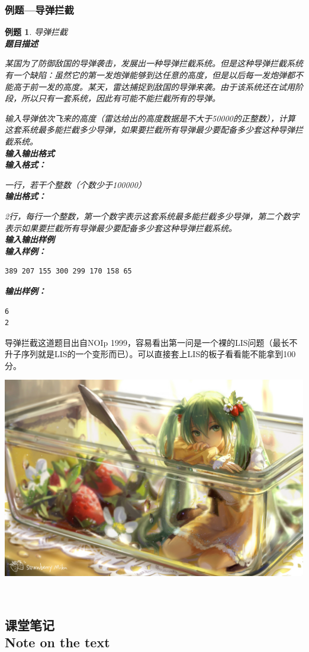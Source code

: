 \documentclass{article}
\newtheorem{example}{例题}[subsection]
\theoremstyle{nonumberplain}
\newcommand{\note}{\ \par


	\subsection*{课堂笔记\\\tiny{Note on the text}}
	\newpage}
\begin{document}
\subsubsection{例题---导弹拦截}
\begin{example}导弹拦截\\
	\textbf{题目描述}

	某国为了防御敌国的导弹袭击，发展出一种导弹拦截系统。但是这种导弹拦截系统有一个缺陷：虽然它的第一发炮弹能够到达任意的高度，但是以后每一发炮弹都不能高于前一发的高度。某天，雷达捕捉到敌国的导弹来袭。由于该系统还在试用阶段，所以只有一套系统，因此有可能不能拦截所有的导弹。

	输入导弹依次飞来的高度（雷达给出的高度数据是不大于50000的正整数），计算这套系统最多能拦截多少导弹，如果要拦截所有导弹最少要配备多少套这种导弹拦截系统。\\
	\textbf{输入输出格式}
	\ \\
	\textbf{输入格式：}

	一行，若干个整数（个数少于100000）
	\ \\
	\textbf{输出格式：}

	2行，每行一个整数，第一个数字表示这套系统最多能拦截多少导弹，第二个数字表示如果要拦截所有导弹最少要配备多少套这种导弹拦截系统。
	\ \\
	\textbf{输入输出样例}
	\ \\
	\textbf{输入样例：}
	\begin{verbatim}
389 207 155 300 299 170 158 65
\end{verbatim}
	\textbf{输出样例：}
	\begin{verbatim}
6
2
\end{verbatim}
\end{example}

导弹拦截这道题目出自NOIp 1999，容易看出第一问是一个裸的LIS问题（最长不升子序列就是LIS的一个变形而已）。可以直接套上LIS的板子看看能不能拿到100分。

\begin{center}\includegraphics[scale=0.80]{43749408_p0.jpg}\end{center}
\note
\end{document}
